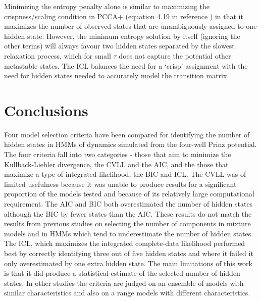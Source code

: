 Minimizing the entropy penalty alone is similar to maximizing the crispness/scaling condition in PCCA+ (equation 4.19 in reference \cite{deuflhardRobustPerronCluster2005b}) in that it maximizes the number of  observed states that are unambiguously assigned to one hidden state. However, the minimum entropy solution by itself (ignoring the other terms) will always favour two hidden states separated by the slowest relaxation process, which for small $\tau$ does not capture the potential other metastable states. The ICL balances the need for a `crisp' assignment with the need for hidden states needed to accurately  model the transition matrix. 

\section{Conclusions}\label{sec:hmm_conclusions}
Four model selection criteria have been compared for identifying the number of hidden states in HMMs of dynamics simulated from the four-well Prinz potential. The four criteria fall into two categories - those that aim to minimize the Kullback-Liebler divergence, the CVLL and the AIC, and the those that maximize a type of integrated likelihood, the BIC and ICL. The CVLL was of limited usefulness because it was unable to produce results for a significant proportion of the models tested and because of its relatively large computational requirement. The AIC and BIC both overestimated the number of hidden states although the BIC by fewer states than the AIC. These results do not match the results from previous studies on selecting the number of components in mixture models and in HMMs which tend to underestimate the number of hidden states. The ICL, which maximizes the integrated complete-data likelihood performed best by correctly identifying three out of five hidden states and where it failed it only overestimated by one extra hidden state. The main limitations of this work is that it did produce a statistical estimate of the selected number of hidden states. In other studies \cite{biernackiAssessingMixtureModel2000a} the criteria are judged on an ensemble of models with similar characteristics and also on a range models with different characteristics.  

